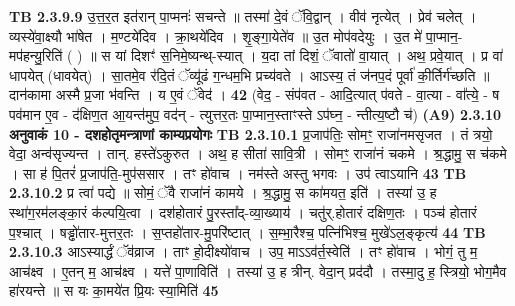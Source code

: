 \documentclass[17pt]{extarticle}
\begin{document}
                  \newline
                                \textbf{ TB 2.3.9.9} \newline
                  उ॒त्त॒र॒त इत॑रान् पा॒प्मनः॑ सचन्ते ॥ तस्मा॑ दे॒वं ॅवि॒द्वान् । वीव॑ नृत्येत् । प्रेव॑ चलेत् । व्यस्ये॑वा॒क्ष्यौ भा॑षेत । म॒ण्टये॑दिव । क्रा॒थये॑दिव । शृ॒ङ्गा॒येते॑व ॥ उ॒त मोप॑वदेयुः । उ॒त मे॑ पा॒प्मान॒-मप॑हन्यु॒रिति॑ ( ) ॥ स यां दिशꣳ॑ स॒निमे॒ष्यन्थ्-स्यात् । य॒दा तां दिशं॒ ॅवातो॑ वा॒यात् । अथ॒ प्रवे॒यात् । प्र वा॑ धापयेत् (धावयेत्) । सा॒तमे॒व र॑दि॒तं ॅव्यू॑ढं ग॒न्धम॒भि प्रच्य॑वते । आऽस्य॒ तं ज॑नप॒दं पूर्वा॑ की॒र्तिर्ग॑च्छति ॥दान॑कामा अस्मै प्र॒जा भ॑वन्ति । य ए॒वं ॅवेद॑ । \textbf{ 42} \newline
                  \newline
                                    (वेद॒ - संप॑वत - आदि॒त्यात् प॑वते - वा॒त्या - वा᳚त्ये॒ - ष पव॑मान ए॒व - द॑क्षिण॒त आ॒यन्त॑मुप॒ वद॑न् - त्युत्तर॒तः पा॒प्मान॒स्ताꣳस्ते ऽप॑घ्न॒ - न्तीत्य॒ष्टौ च॑) \textbf{(A9)} \newline \newline
                \textbf{ 2.3.10    अनुवाकं   10 - दशहोतृमन्त्राणां काम्यप्रयोगः} \newline
                                \textbf{ TB 2.3.10.1} \newline
                  प्र॒जाप॑तिः॒ सोमꣳ॒॒ राजा॑नमसृजत । तं त्रयो॒ वेदा॒ अन्व॑सृज्यन्त । तान्. हस्ते॑ऽकुरुत । अथ॒ ह सीता॑ सावि॒त्री । सोमꣳ॒॒ राजा॑नं चकमे । श्र॒द्धामु॒ स च॑कमे । सा ह॑ पि॒तरं॑ प्र॒जाप॑ति॒-मुप॑ससार । तꣳ हो॑वाच । नम॑स्ते अस्तु भगवः । उप॑ त्वाऽयानि \textbf{ 43} \newline
                  \newline
                                \textbf{ TB 2.3.10.2} \newline
                  प्र त्वा॑ पद्ये ॥ सोमं॒ ॅवै राजा॑नं कामये । श्र॒द्धामु॒ स का॑मयत॒ इति॑ । तस्या॑ उ॒ ह स्था॑ग॒रम॑लङ्का॒रं क॑ल्पयि॒त्वा । दश॑होतारं पु॒रस्ता᳚द्-व्या॒ख्याय॑ । चतु॑र्.होतारं दक्षिण॒तः । पञ्च॑ होतारं प॒श्चात् । षड्ढो॑तार-मुत्तर॒तः । स॒प्तहो॑तार-मु॒परि॑ष्टात् । स॒म्भा॒रैश्च॒ पत्नि॑भिश्च॒ मुखे॑ऽल॒ङ्कृत्य॑ \textbf{ 44} \newline
                  \newline
                                \textbf{ TB 2.3.10.3} \newline
                  आऽस्यार्द्धं ॅव॑व्राज । ताꣳ हो॒दीक्ष्यो॑वाच । उप॒ माऽऽव॑र्त॒स्वेति॑ । तꣳ हो॑वाच । भोगं॒ तु म॒ आच॑क्ष्व । ए॒तन् म॒ आच॑क्ष्व । यत्ते॑ पा॒णाविति॑ । तस्या॑ उ॒ ह त्रीन्. वेदा॒न् प्रद॑दौ । तस्मा॒दु ह॒ स्त्रियो॒ भोग॒मैव हा॑रयन्ते ॥ स यः का॒मये॑त प्रि॒यः स्या॒मिति॑ \textbf{ 45} \newline
\end{document}
